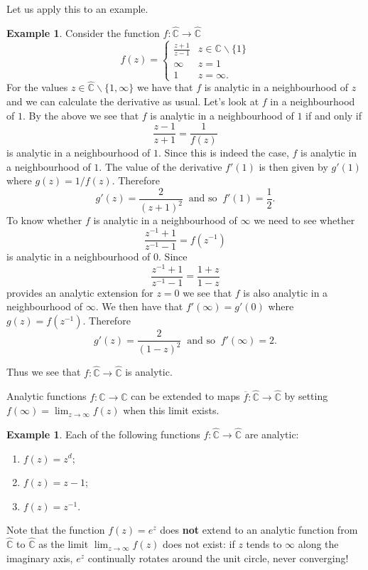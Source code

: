 \documentclass[12pt]{article}
\theoremstyle{definition}
\newtheorem{example}[theorem]{Example}
\theoremstyle{remark}
\begin{document}
Let us apply this to an example.
\begin{example}\label{ex.analytic}
Consider the function $f: \widehat{\mathbb{C}}  \to \widehat{\mathbb{C}}$
\[
f(z) = \begin{cases}
       \frac{z+1}{z-1} &z \in \mathbb{C}\backslash\{1 \} \\
       \infty &z=1 \\
       1 &z = \infty.
     \end{cases}
\]
For the values $z \in \widehat{\mathbb{C}} \backslash \{ 1, \infty \}$ we have that $f$ is analytic in a neighbourhood of $z$ and we can calculate the derivative as usual. Let's look at $f$ in a neighbourhood of $1$. By the above we see that $f$ is analytic in a neighbourhood of $1$ if and only if 
\[
\frac{z-1}{z+1} = \frac{1}{f(z)}
\]
is analytic in a neighbourhood of $1$. Since this is indeed the case, $f$ is analytic in a neighbourhood of $1$. The value of the derivative $f'(1)$ is then given by $g'(1)$ where $g(z) =1/f(z)$. Therefore
\[
g'(z) = \frac{2}{(z+1)^2}\ \text{ and so } \ f'(1) =  \frac{1}{2}.
\]
 To know whether $f$ is analytic in a neighbourhood of $\infty$ we need to see whether
\[
\frac{z^{-1} + 1}{z^{-1} -1} = f(z^{-1})
\]
is analytic in a neighbourhood of $0$. Since
\[
\frac{z^{-1} + 1}{z^{-1} -1} = \frac{1 + z}{1 - z}
\]
provides an analytic extension for $z = 0$ we see that $f$ is also analytic in a neighbourhood of $\infty$. We then have that $f'(\infty) = g'(0)$ where $g(z) = f(z^{-1})$. Therefore
\[
g'(z) = \frac{2}{(1-z)^2} \ \text{ and so } \ f'(\infty) = 2.
\]

Thus we see that $f : \widehat{\mathbb{C}} \to \widehat{\mathbb{C}}$ is analytic.
\end{example}

Analytic functions $f : \mathbb{C} \to \mathbb{C}$ can be extended to maps $\overline{f} : \widehat{\mathbb{C}} \to \widehat{\mathbb{C}}$ by setting $f(\infty) = \lim_{z \to \infty} f(z)$ when this limit exists.

\begin{example}
Each of the following functions $f: \widehat{\mathbb{C}} \to \widehat{\mathbb{C}}$ are analytic:
\begin{enumerate}
\item $f(z) = z^d$;
\item $f(z) = z-1$;
\item $f(z) = z^{-1}$.
\end{enumerate}
Note that the function $f(z) =e^z$ does \textbf{not} extend to an analytic function from $\widehat{\mathbb{C}}$ to $\widehat{\mathbb{C}}$ as the limit $\lim_{z \to \infty} f(z)$ does not exist: if $z$ tends to $\infty$ along the imaginary axis, $e^{z}$ continually rotates around the unit circle, never converging!
\end{example} 
\end{document}
